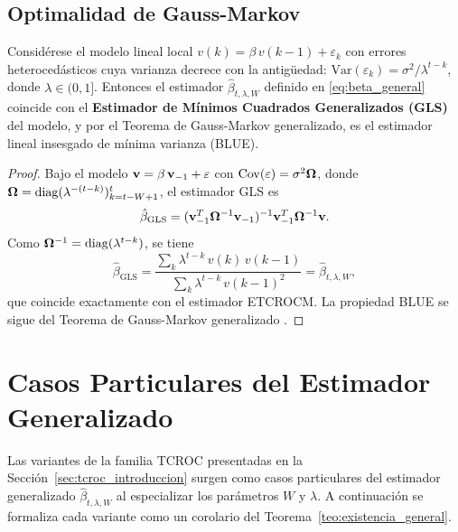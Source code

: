 \subsection{Optimalidad de Gauss-Markov}
\label{subsec:teorema_optimalidad}

\begin{theorem}
\label{teo:optimalidad_general}
Considérese el modelo lineal local
$v(k) = \beta\, v(k-1) + \varepsilon_k$ con errores
heterocedásticos cuya varianza decrece con la antigüedad:
$\mathrm{Var}(\varepsilon_k) = \sigma^2 / \lambda^{t-k}$,
donde $\lambda \in (0,1]$.  Entonces el estimador
$\hat{\beta}_{t,\lambda,W}$ definido en \eqref{eq:beta_general}
coincide con el \textbf{Estimador de Mínimos Cuadrados
Generalizados (GLS)} del modelo, y por el Teorema de
Gauss-Markov generalizado, es el estimador lineal insesgado de
mínima varianza (BLUE).
\end{theorem}

\begin{proof}
Bajo el modelo $\mathbf{v} = \beta\,\mathbf{v}_{-1} + \mathbf{\varepsilon}$
con $\mathrm{Cov}(\mathbf{\varepsilon}) = \sigma^2 \mathbf{\Omega}$,
donde $\mathbf{\Omega} = \mathrm{diag}(\lambda^{-(t-k)})_{k=t-W+1}^{t}$,
el estimador GLS es
\[
\hat{\beta}_{\text{GLS}}
= (\mathbf{v}_{-1}^T \mathbf{\Omega}^{-1} \mathbf{v}_{-1})^{-1}
  \mathbf{v}_{-1}^T \mathbf{\Omega}^{-1} \mathbf{v}.
\]
Como $\mathbf{\Omega}^{-1} = \mathrm{diag}(\lambda^{t-k})$, se tiene
\[
\hat{\beta}_{\text{GLS}}
= \frac{\sum_{k} \lambda^{t-k}\, v(k)\, v(k-1)}
      {\sum_{k} \lambda^{t-k}\, v(k-1)^2}
= \hat{\beta}_{t,\lambda,W},
\]
que coincide exactamente con el estimador ETCROCM.  La propiedad
BLUE se sigue del Teorema de Gauss-Markov generalizado
\cite{Aitken1936, Anderson1971}.
\end{proof}

\section{Casos Particulares del Estimador Generalizado}
\label{sec:tcroc_corolarios}

Las variantes de la familia TCROC presentadas en la
Sección~\ref{sec:tcroc_introduccion} surgen como casos particulares
del estimador generalizado $\hat{\beta}_{t,\lambda,W}$ al
especializar los parámetros $W$ y $\lambda$.  A continuación se
formaliza cada variante como un corolario del
Teorema~\ref{teo:existencia_general}.

